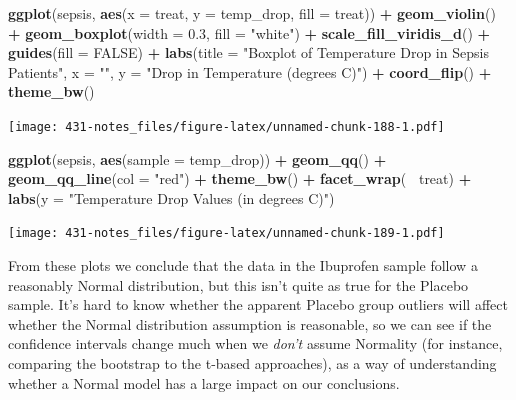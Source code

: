 \documentclass[
]{book}
\newenvironment{Shaded}{\begin{snugshade}}{\end{snugshade}}
\newcommand{\DataTypeTok}[1]{\textcolor[rgb]{0.13,0.29,0.53}{#1}}
\newcommand{\FloatTok}[1]{\textcolor[rgb]{0.00,0.00,0.81}{#1}}
\newcommand{\KeywordTok}[1]{\textcolor[rgb]{0.13,0.29,0.53}{\textbf{#1}}}
\newcommand{\NormalTok}[1]{#1}
\newcommand{\OperatorTok}[1]{\textcolor[rgb]{0.81,0.36,0.00}{\textbf{#1}}}
\newcommand{\OtherTok}[1]{\textcolor[rgb]{0.56,0.35,0.01}{#1}}
\newcommand{\StringTok}[1]{\textcolor[rgb]{0.31,0.60,0.02}{#1}}
\begin{document}
\begin{Shaded}
\begin{Highlighting}[]
\KeywordTok{ggplot}\NormalTok{(sepsis, }\KeywordTok{aes}\NormalTok{(}\DataTypeTok{x =}\NormalTok{ treat, }\DataTypeTok{y =}\NormalTok{ temp_drop, }\DataTypeTok{fill =}\NormalTok{ treat)) }\OperatorTok{+}
\StringTok{    }\KeywordTok{geom_violin}\NormalTok{() }\OperatorTok{+}
\StringTok{    }\KeywordTok{geom_boxplot}\NormalTok{(}\DataTypeTok{width =} \FloatTok{0.3}\NormalTok{, }\DataTypeTok{fill =} \StringTok{"white"}\NormalTok{) }\OperatorTok{+}
\StringTok{    }\KeywordTok{scale_fill_viridis_d}\NormalTok{() }\OperatorTok{+}
\StringTok{    }\KeywordTok{guides}\NormalTok{(}\DataTypeTok{fill =} \OtherTok{FALSE}\NormalTok{) }\OperatorTok{+}\StringTok{ }
\StringTok{    }\KeywordTok{labs}\NormalTok{(}\DataTypeTok{title =} \StringTok{"Boxplot of Temperature Drop in Sepsis Patients"}\NormalTok{,}
         \DataTypeTok{x =} \StringTok{""}\NormalTok{, }\DataTypeTok{y =} \StringTok{"Drop in Temperature (degrees C)"}\NormalTok{) }\OperatorTok{+}\StringTok{ }
\StringTok{    }\KeywordTok{coord_flip}\NormalTok{() }\OperatorTok{+}
\StringTok{    }\KeywordTok{theme_bw}\NormalTok{()}
\end{Highlighting}
\end{Shaded}

\texttt{[image: 431-notes\_files/figure-latex/unnamed-chunk-188-1.pdf]}

\begin{Shaded}
\begin{Highlighting}[]
\KeywordTok{ggplot}\NormalTok{(sepsis, }\KeywordTok{aes}\NormalTok{(}\DataTypeTok{sample =}\NormalTok{ temp_drop)) }\OperatorTok{+}
\StringTok{    }\KeywordTok{geom_qq}\NormalTok{() }\OperatorTok{+}\StringTok{ }\KeywordTok{geom_qq_line}\NormalTok{(}\DataTypeTok{col =} \StringTok{"red"}\NormalTok{) }\OperatorTok{+}
\StringTok{    }\KeywordTok{theme_bw}\NormalTok{() }\OperatorTok{+}
\StringTok{    }\KeywordTok{facet_wrap}\NormalTok{(}\OperatorTok{~}\StringTok{ }\NormalTok{treat) }\OperatorTok{+}\StringTok{ }
\StringTok{    }\KeywordTok{labs}\NormalTok{(}\DataTypeTok{y =} \StringTok{"Temperature Drop Values (in degrees C)"}\NormalTok{)}
\end{Highlighting}
\end{Shaded}

\texttt{[image: 431-notes\_files/figure-latex/unnamed-chunk-189-1.pdf]}

From these plots we conclude that the data in the Ibuprofen sample follow a reasonably Normal distribution, but this isn't quite as true for the Placebo sample. It's hard to know whether the apparent Placebo group outliers will affect whether the Normal distribution assumption is reasonable, so we can see if the confidence intervals change much when we \emph{don't} assume Normality (for instance, comparing the bootstrap to the t-based approaches), as a way of understanding whether a Normal model has a large impact on our conclusions.
\end{document}
